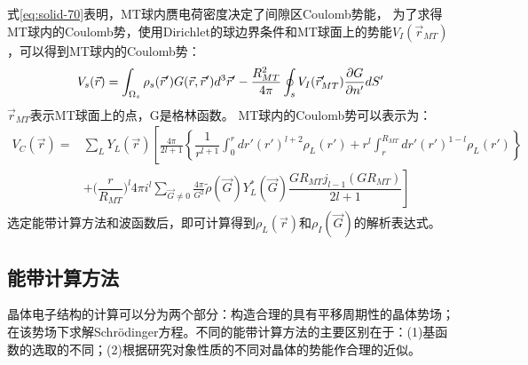 式\eqref{eq:solid-70}表明，MT球内赝电荷密度决定了间隙区Coulomb势能，
为了求得MT球内的Coulomb势，使用Dirichlet的球边界条件\cite{Landau-Lifshitz}和MT球面上的势能$V_I(\vec r_{MT})$，可以得到MT球内的Coulomb势：
\begin{displaymath}
  V_s(\vec r)=\int_{\Omega_s}\rho_s(\vec r')G(\vec r,\vec r')d^3\vec r'-\dfrac{R_{MT}^2}{4\pi}\ointop\nolimits_sV_I(\vec r_{MT}')\frac{\partial G}{\partial n'}dS'
  \label{eq:solid-77}
\end{displaymath}
$\vec r_{MT}$表示MT球面上的点，G是格林函数。%
MT球内的Coulomb势可以表示为：
\begin{displaymath}
  \begin{split}
    V_C(\vec r)=&\sum_LY_L(\vec r)\left[\frac{4\pi}{2l+1}\left\{\dfrac1{r^{l+1}}\int_0^rdr'(r')^{l+2}\rho_L(r')+r^l\int_r^{R_{MT}}dr'(r')^{1-l}\rho_L(r')\right\}\right.\\
    &+\biggl(\dfrac r{R_{MT}}\biggr)^l4\pi i^l\sum_{\vec G\neq0}\frac{4\pi}{G^2}\tilde\rho(\vec G)Y_L^{\ast}(\vec G)\left.\dfrac{GR_{MT}j_{l-1}(GR_{MT})}{2l+1}\right]
  \end{split}
\end{displaymath}
选定能带计算方法和波函数后，即可计算得到$\rho_L(\vec r)$和$\rho_I(\vec G)$的解析表达式。

\subsection{能带计算方法}
晶体电子结构的计算可以分为两个部分：构造合理的具有平移周期性的晶体势场；在该势场下求解Schr\"odinger方程。不同的能带计算方法的主要区别在于：(1)基函数的选取的不同；(2)根据研究对象性质的不同对晶体的势能作合理的近似。

